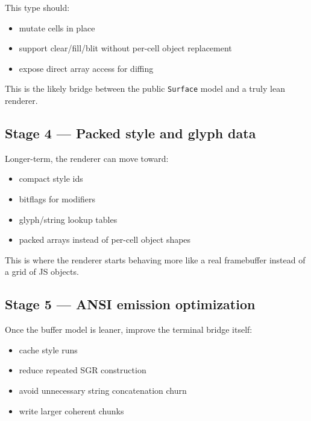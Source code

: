 This type should:

\begin{itemize}
\tightlist
\item
  mutate cells in place
\item
  support clear/fill/blit without per-cell object replacement
\item
  expose direct array access for diffing
\end{itemize}

This is the likely bridge between the public \texttt{S\allowbreak{}u\allowbreak{}r\allowbreak{}f\allowbreak{}a\allowbreak{}c\allowbreak{}e} model and a truly lean renderer.

\subsection{Stage 4 --- Packed style and glyph data}\label{record-052-stage-4-packed-style-and-glyph-data}

Longer-term, the renderer can move toward:

\begin{itemize}
\tightlist
\item
  compact style ids
\item
  bitflags for modifiers
\item
  glyph/string lookup tables
\item
  packed arrays instead of per-cell object shapes
\end{itemize}

This is where the renderer starts behaving more like a real framebuffer instead of a grid of JS objects.

\subsection{Stage 5 --- ANSI emission optimization}\label{record-052-stage-5-ansi-emission-optimization}

Once the buffer model is leaner, improve the terminal bridge itself:

\begin{itemize}
\tightlist
\item
  cache style runs
\item
  reduce repeated SGR construction
\item
  avoid unnecessary string concatenation churn
\item
  write larger coherent chunks
\end{itemize}

